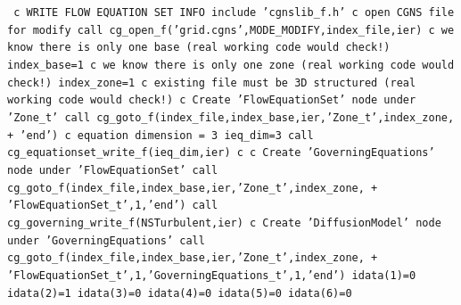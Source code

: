 \documentclass[12pt]{article}
\begin{document}
{\tt
\noindent c   WRITE FLOW EQUATION SET INFO
\newline\indent      include 'cgnslib\_f.h'
\newline c   open CGNS file for modify
\newline\indent      call cg\_open\_f('grid.cgns',MODE\_MODIFY,index\_file,ier)
\newline c   we know there is only one base (real working code would check!)
\newline\indent      index\_base=1
\newline c   we know there is only one zone (real working code would check!)
\newline\indent      index\_zone=1
\newline c   existing file must be 3D structured (real working code would check!)
\newline c   Create 'FlowEquationSet' node under 'Zone\_t'
\newline\indent      call cg\_goto\_f(index\_file,index\_base,ier,'Zone\_t',index\_zone,
\newline + \indent   'end')
\newline c   equation dimension = 3
\newline\indent      ieq\_dim=3
\newline\indent      call cg\_equationset\_write\_f(ieq\_dim,ier)
\newline c
\newline c   Create 'GoverningEquations' node under 'FlowEquationSet'
\newline\indent      call cg\_goto\_f(index\_file,index\_base,ier,'Zone\_t',index\_zone,
\newline + \indent 'FlowEquationSet\_t',1,'end')
\newline\indent      call cg\_governing\_write\_f(NSTurbulent,ier)
\newline c   Create 'DiffusionModel' node under 'GoverningEquations'
\newline\indent      call cg\_goto\_f(index\_file,index\_base,ier,'Zone\_t',index\_zone,
\newline + \indent 'FlowEquationSet\_t',1,'GoverningEquations\_t',1,'end')
\newline\indent      idata(1)=0
\newline\indent      idata(2)=1
\newline\indent      idata(3)=0
\newline\indent      idata(4)=0
\newline\indent      idata(5)=0
\newline\indent      idata(6)=0
}
\end{document}
